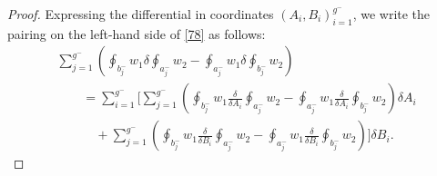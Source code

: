 \documentclass[pdftex]{sigma}
\numberwithin{equation}{section}
\theoremstyle{definition}
\begin{document}
\begin{proof}
Expressing the differential in coordinates $(A_i, B_i)^{g^-}_{i=1}$, we write the pairing on the left-hand side of \eqref{78} as follows:
\begin{gather}%
\sum^{g^-}_{j=1} \left(\oint_{b^-_j} w_1 \delta\oint_{a^-_j}w_2 - \oint_{a^-_j}w_1 \delta\oint_{b^-_j}w_2 \right)\nonumber\\
\label{82}\qquad{}=\sum^{g^-}_{i=1}\Bigg[ \sum^{g^-}_{j=1}\left(\oint_{b^-_j} w_1 \frac{\delta}{\delta A_i}\oint_{a^-_j}w_2-\oint_{a^-_j} w_1 \frac{\delta}{\delta A_i}\oint_{b^-_j}w_2\right)\delta A_i \\
\label{83}\qquad\quad{} +\sum^{g^-}_{j=1}\left(\oint_{b^-_j} w_1 \frac{\delta}{\delta B_i}\oint_{a^-_j}w_2-\oint_{a^-_j} w_1 \frac{\delta}{\delta B_i}\oint_{b^-_j}w_2\right)\Bigg]\delta B_i. \end{gather}


\end{proof}
\end{document}
